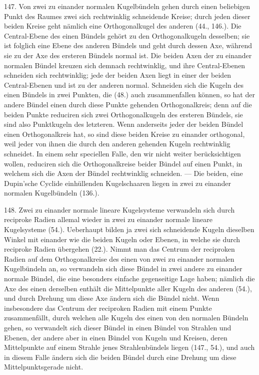 147. Von zwei zu einander normalen Kugelb\"undeln gehen
durch einen beliebigen Punkt des Raumes zwei sich rechtwinklig
schneidende Kreise; durch jeden dieser beiden Kreise
geht n\"amlich eine Orthogonalkugel des anderen (44., 146.).
Die Central-Ebene des einen B\"undels geh\"ort zu den Orthogonalkugeln
desselben; sie ist folglich eine Ebene des anderen
B\"undels und geht durch dessen Axe, w\"ahrend sie zu der
Axe des ersteren B\"undels normal ist. Die beiden Axen der
zu einander normalen B\"undel kreuzen sich demnach rechtwinklig,
und ihre Central-Ebenen schneiden sich rechtwinklig;
jede der beiden Axen liegt in einer der beiden Central-Ebenen
und ist zu der anderen normal. Schneiden sich die Kugeln
des einen B\"undels in zwei Punkten, die (48.) auch zusammenfallen
k\"onnen, so hat der andere B\"undel einen durch diese
Punkte gehenden Orthogonalkreis; denn auf die beiden Punkte
reduciren sich zwei Orthogonalkugeln des ersteren B\"undels,
sie sind also Punktkugeln des letzteren. Wenn anderseits
jeder der beiden B\"undel einen Orthogonalkreis hat, so sind
diese beiden Kreise zu einander orthogonal, weil jeder von
ihnen die durch den anderen gehenden Kugeln rechtwinklig
schneidet. In einem sehr speciellen Falle, den wir nicht
weiter ber\"ucksichtigen wollen, reduciren sich die Orthogonalkreise
beider B\"undel auf einen Punkt, in welchem sich die
Axen der B\"undel rechtwinklig schneiden. --- Die beiden,
eine Dupin'sche Cyclide einh\"ullenden Kugelschaaren liegen
in zwei zu einander normalen Kugelb\"undeln (136.).

148. Zwei zu einander normale lineare Kugelsysteme
verwandeln sich durch reciproke Radien allemal wieder in
zwei zu einander normale lineare Kugelsysteme (54.). Ueberhaupt
bilden ja zwei sich schneidende Kugeln dieselben
Winkel mit einander wie die beiden Kugeln oder Ebenen, in
welche sie durch reciproke Radien \"ubergehen (22.). Nimmt
man das Centrum der reciproken Radien auf dem Orthogonalkreise
des einen von zwei zu einander normalen Kugelb\"undeln
an, so verwandeln sich diese B\"undel in zwei andere
zu einander normale B\"undel, die eine besonders einfache
gegenseitige Lage haben; n\"amlich die Axe des einen derselben
enth\"alt die Mittelpunkte aller Kugeln des anderen (54.), und
durch Drehung um diese Axe \"andern sich die B\"undel nicht.
Wenn insbesondere das Centrum der reciproken Radien mit
einem Punkte zusammenf\"allt, durch welchen alle Kugeln des
einen von den normalen B\"undeln gehen, so verwandelt sich
dieser B\"undel in einen B\"undel von Strahlen und Ebenen,
der andere aber in einen B\"undel von Kugeln und Kreisen,
deren Mittelpunkte auf einem Strahle jenes Strahlenb\"undels
liegen (147., 54.), und auch in diesem Falle \"andern sich die
beiden B\"undel durch eine Drehung um diese Mittelpunktsgerade nicht.

